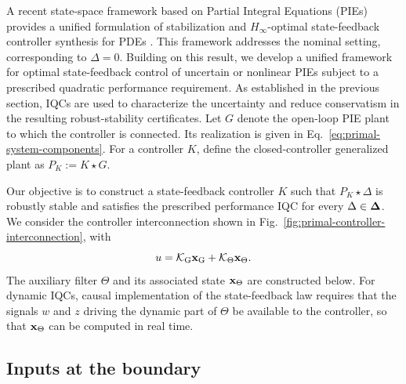 A recent state-space framework based on Partial Integral Equations (PIEs)
provides a unified formulation of stabilization and
$H_\infty$-optimal state-feedback controller synthesis for PDEs
\cite{shivaknew}. This framework addresses the nominal setting, corresponding
to $\Delta=0$. Building on this result, we develop a unified framework for
optimal state-feedback control of uncertain or nonlinear PIEs subject to a
prescribed quadratic performance requirement. As established in the previous
section, IQCs are used to characterize the uncertainty and reduce conservatism
in the resulting robust-stability certificates. Let $G$ denote the open-loop
PIE plant to which the controller is connected. Its realization is given in
Eq.~\eqref{eq:primal-system-components}. For a controller $K$, define the
closed-controller generalized plant as $P_K:=K\star G$.

Our objective is to construct a state-feedback controller $K$ such that
$P_K\star\Delta$ is robustly stable and satisfies the prescribed performance
IQC for every $\Delta\in\mathbf{\Delta}$. We consider the controller
interconnection shown in Fig.~\ref{fig:primal-controller-interconnection}, with
\begin{equation}\label{eq:primal-controller}
    u
    = \mathcal{K}_{{\mathrm{G}}}\mathbf{x}_{{\mathrm{G}}}
    + \mathcal{K}_{\Theta}\mathbf{x}_{\Theta}.
\end{equation}
The auxiliary filter $\Theta$ and its associated state $\mathbf{x}_{\Theta}$ are
constructed below. For dynamic IQCs, causal implementation of the
state-feedback law requires that the signals $w$ and $z$ driving the dynamic
part of $\Theta$ be available to the controller, so that $\mathbf{x}_{\Theta}$ can
be computed in real time.

\primalcontrollerfigure

\subsection{Inputs at the boundary}

